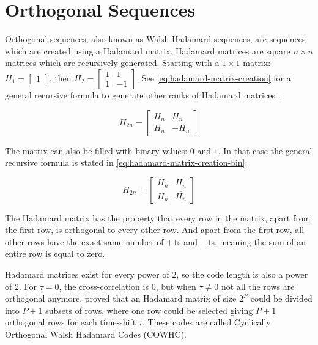 
\section{Orthogonal Sequences}

Orthogonal sequences, also known as Walsh-Hadamard sequences, are sequences which are created using a Hadamard matrix.
Hadamard matrices are square $n \times n$ matrices which are recursively generated.
Starting with a $1 \times 1$ matrix: 
		$H_{1} = \begin{bmatrix} 1 \end{bmatrix}$, then 
		$H_{2} = \begin{bmatrix} 1 & 1 \\ 1 & -1 \end{bmatrix}$.
See \autoref{eq:hadamard-matrix-creation} for a general recursive formula to generate other ranks of Hadamard matrices \cite{714616}.

\begin{equation}
	H_{2n} = 
	\begin{bmatrix} 
		H_n & H_n \\ 
		H_n & -H_n 
	\end{bmatrix}
	\label{eq:hadamard-matrix-creation}
\end{equation}

The matrix can also be filled with binary values: $0$ and $1$. In that case the general recursive formula is stated in \autoref{eq:hadamard-matrix-creation-bin}. 

\begin{equation}
	H_{2n} = 
	\begin{bmatrix} 
		H_n & H_n \\ 
		H_n & \overline{H_n}
	\end{bmatrix}
	\label{eq:hadamard-matrix-creation-bin}
\end{equation}




The Hadamard matrix has the property that every row in the matrix, apart from the first row, is orthogonal to every other row.
And apart from the first row, all other rows have the exact same number of $+1$s and $-1$s, meaning the sum of an entire row is equal to zero.

Hadamard matrices exist for every power of $2$, so the code length is also a power of $2$.
For $\tau = 0$, the cross-correlation is $0$, but when $\tau \neq 0$ not all the rows are orthogonal anymore.
\cite{1182447} proved that an Hadamard matrix of size $2^P$ could be divided into $P + 1$ subsets of rows, where one row could be selected giving $P + 1$ orthogonal rows for each time-shift $\tau$.
These codes are called Cyclically Orthogonal Walsh Hadamard Codes (COWHC).

